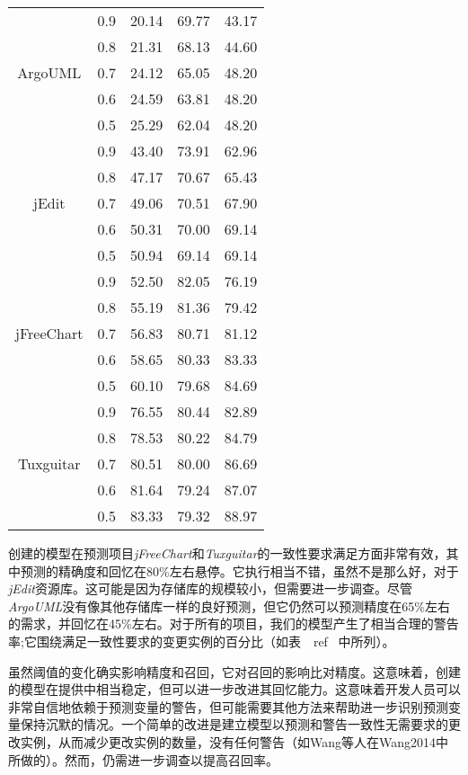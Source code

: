 {\begin{table}[htbp]
\begin{tabular}{ccccc}
\midrule[1pt]
 \multirow{5}{*}{ArgoUML}
&0.9&	20.14&	69.77&	43.17\\
&0.8&	21.31&	68.13&	44.60\\
&0.7&	24.12&	65.05&	48.20\\
&0.6&	24.59&	63.81&	48.20\\
&0.5&	25.29&	62.04&	48.20\\
\hline
\multirow{5}{*}{jEdit}
&0.9&	43.40&	73.91&	62.96\\
&0.8&	47.17&	70.67&	65.43\\
&0.7&	49.06&	70.51&	67.90\\
&0.6&	50.31&	70.00&	69.14\\
&0.5&	50.94&	69.14&	69.14\\
\hline
\multirow{5}{*}{jFreeChart}
&0.9&	52.50&	82.05&	76.19\\
&0.8&	55.19&	81.36&	79.42\\
&0.7&	56.83&	80.71&	81.12\\
&0.6&	58.65&	80.33&	83.33\\
&0.5&	60.10&	79.68&	84.69\\
\hline
\multirow{5}{*}{Tuxguitar}
&0.9	&76.55&   80.44&	82.89\\
&0.8	&78.53&	80.22&	84.79\\
&0.7	&80.51&	80.00&	86.69\\
&0.6	&81.64&	79.24&	87.07\\
&0.5    &83.33&	79.32&	88.97\\
\bottomrule[1.5pt]
\end{tabular}
\end{table}

创建的模型在预测项目{\em jFreeChart}和{\em Tuxguitar}的一致性要求满足方面非常有效，其中预测的精确度和回忆在80\%左右悬停。它执行相当不错，虽然不是那么好，对于{\em jEdit}资源库。这可能是因为存储库的规模较小，但需要进一步调查。尽管{\em  ArgoUML}没有像其他存储库一样的良好预测，但它仍然可以预测精度在65\%左右的需求，并回忆在45\%左右。对于所有的项目，我们的模型产生了相当合理的警告率;它围绕满足一致性要求的变更实例的百分比（如表~\ ref {}~中所列）。

虽然阈值的变化确实影响精度和召回，它对召回的影响比对精度。这意味着，创建的模型在提供中相当稳定，但可以进一步改进其回忆能力。这意味着开发人员可以非常自信地依赖于预测变量的警告，但可能需要其他方法来帮助进一步识别预测变量保持沉默的情况。一个简单的改进是建立模型以预测和警告一致性无需要求的更改实例，从而减少更改实例的数量，没有任何警告（如Wang等人在\cite{}{Wang2014}中所做的）。然而，仍需进一步调查以提高召回率。

}

